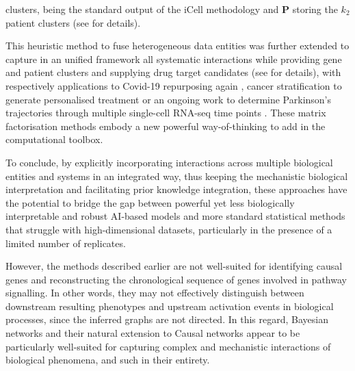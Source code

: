 clusters, being the standard output of the iCell methodology and $\boldsymbol{P}$ storing the $k_2$ patient clusters (see \parencite[Eq.1]{xenos_etal23} for details).

This heuristic method to fuse heterogeneous data entities was further extended to capture in an unified framework all systematic interactions while providing gene and patient clusters and supplying drug target candidates (see  for details), with respectively applications to Covid-19 repurposing again \autocite{zambrana_etal21}, cancer stratification to generate personalised treatment \autocite{gligorijevi_etal15} or an ongoing work to determine Parkinson’s trajectories through multiple single-cell RNA-seq time points \autocite[Poster ID: 8328, session P236-M]{PosterECCB2022}. 
These matrix factorisation methods embody a new powerful way-of-thinking to add in the computational toolbox. 

To conclude, by explicitly incorporating interactions across multiple biological entities and systems in an integrated way, thus keeping the mechanistic biological interpretation and facilitating prior knowledge integration, these approaches have the potential to bridge the gap between powerful yet less biologically interpretable and robust AI-based models and more standard statistical methods that struggle with high-dimensional datasets, particularly in the presence of a limited number of replicates. 


However, the methods described earlier are not well-suited for identifying causal genes and reconstructing the chronological sequence of genes involved in pathway signalling. In other words, they may not effectively distinguish between downstream resulting phenotypes and upstream activation events in biological processes, since the inferred graphs are not directed. In this regard, Bayesian networks and their natural extension to Causal networks appear to be particularly well-suited for capturing complex and mechanistic interactions of biological phenomena, and such in their entirety.

